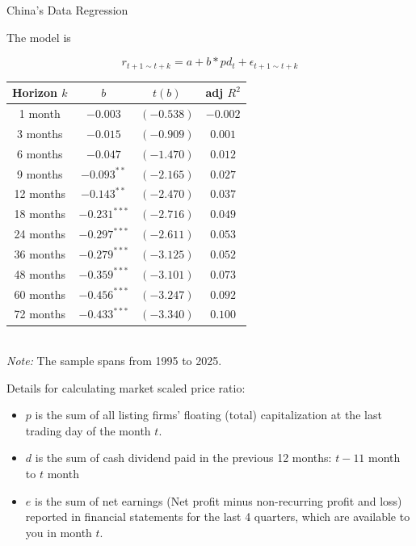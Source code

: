 \documentclass{beamer}
\begin{document}
\begin{frame}{China's Data Regression}

	The model is 

	\begin{equation*}
	r_{t+1\sim t+k} = a + b * pd_{t} + \epsilon_{t+1\sim t+k}
	\end{equation*}

	\centering
   \small
\begin{tabular}{cccc}
  
    \hline 
    Horizon $k$ & $b$ & $t(b)$ & adj $R^{2}$ \\
    \hline 
    1 month   & $-0.003$           & $(-0.538)$          & $-0.002$ \\
    3 months  & $-0.015$           & $(-0.909)$          & $0.001$  \\
    6 months  & $-0.047$           & $(-1.470)$          & $0.012$  \\
    9 months  & $-0.093^{**}$      & $(-2.165)$          & $0.027$  \\
    12 months & $-0.143^{**}$      & $(-2.470)$          & $0.037$  \\
    18 months & $-0.231^{***}$     & $(-2.716)$          & $0.049$  \\
    24 months & $-0.297^{***}$     & $(-2.611)$          & $0.053$  \\
    36 months & $-0.279^{***}$     & $(-3.125)$          & $0.052$  \\
    48 months & $-0.359^{***}$     & $(-3.101)$          & $0.073$  \\
    60 months & $-0.456^{***}$     & $(-3.247)$          & $0.092$  \\
    72 months & $-0.433^{***}$     & $(-3.340)$          & $0.100$  \\
    \hline
\end{tabular}
\\
\noindent\textit{Note:} The sample spans from 1995 to 2025.

\end{frame}

\begin{frame}{Details for calculating market scaled price ratio:}
	\begin{itemize}
		\item $p$ is the sum of all listing firms' floating (total) capitalization at the last trading day of the month $t$.
		\item  $ d $ is the sum of cash dividend paid in the previous 12 months: $t-11$ month to $t$ month
		\item  $e$ is the sum of net earnings (Net profit minus non-recurring profit and loss) reported in financial statements for the last 4 quarters, which are available to you in month $t$. 
	\end{itemize}
\end{frame}
\end{document}
